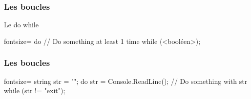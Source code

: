 \begin{frame}[fragile]
  \frametitle{Les boucles}

  \begin{center}{\large Le do while}\end{center}
  \begin{csharpcode*}{fontsize=\scriptsize}
    do
    {
      // Do something at least 1 time
    } while (<booléen>);
  \end{csharpcode*}
\end{frame}

\begin{frame}[fragile]
  \frametitle{Les boucles}

  \begin{csharpcode*}{fontsize=\scriptsize}
    string str = "";
    do
    {
      str = Console.ReadLine();
      // Do something with str
    } while (str != "exit");
  \end{csharpcode*}
\end{frame}
